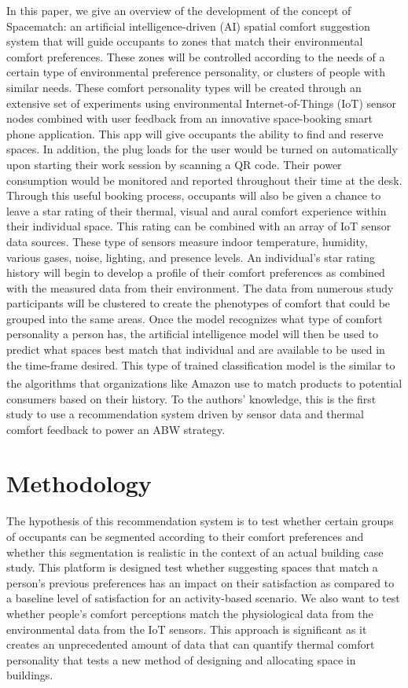 \documentclass[]{interact}
\theoremstyle{plain}%
\theoremstyle{definition}
\theoremstyle{remark}
\begin{document}
In this paper, we give an overview of the development of the concept of Spacematch: an artificial intelligence-driven (AI) spatial comfort suggestion system that will guide occupants to zones that match their environmental comfort preferences. These zones will be controlled according to the needs of a certain type of environmental preference personality, or clusters of people with similar needs. These comfort personality types will be created through an extensive set of experiments using environmental Internet-of-Things (IoT) sensor nodes combined with user feedback from an innovative space-booking smart phone application. This app will give occupants the ability to find and reserve spaces. In addition, the plug loads for the user would be turned on automatically upon starting their work session by scanning a QR code. Their power consumption would be monitored and reported throughout their time at the desk. Through this useful booking process, occupants will also be given a chance to leave a star rating of their thermal, visual and aural comfort experience within their individual space. This rating can be combined with an array of IoT sensor data sources. These type of sensors measure indoor temperature, humidity, various gases, noise, lighting, and presence levels. An individual’s star rating history will begin to develop a profile of their comfort preferences as combined with the measured data from their environment. The data from numerous study participants will be clustered to create the phenotypes of comfort that could be grouped into the same areas. Once the model recognizes what type of comfort personality a person has, the artificial intelligence model will then be used to predict what spaces best match that individual and are available to be used in the time-frame desired. This type of trained classification model is the similar to the algorithms that organizations like Amazon\textsuperscript{\textregistered} use to match products to potential consumers based on their history. To the authors' knowledge, this is the first study to use a recommendation system driven by sensor data and thermal comfort feedback to power an ABW strategy.



\section{Methodology}
The hypothesis of this recommendation system is to test whether certain groups of occupants can be segmented according to their comfort preferences and whether this segmentation is realistic in the context of an actual building case study. This platform is designed test whether suggesting spaces that match a person’s previous preferences has an impact on their satisfaction as compared to a baseline level of satisfaction for an activity-based scenario. We also want to test whether people’s comfort perceptions match the physiological data from the environmental data from the IoT sensors. This approach is significant as it creates an unprecedented amount of data that can quantify thermal comfort personality that tests a new method of designing and allocating space in buildings. 
\end{document}
